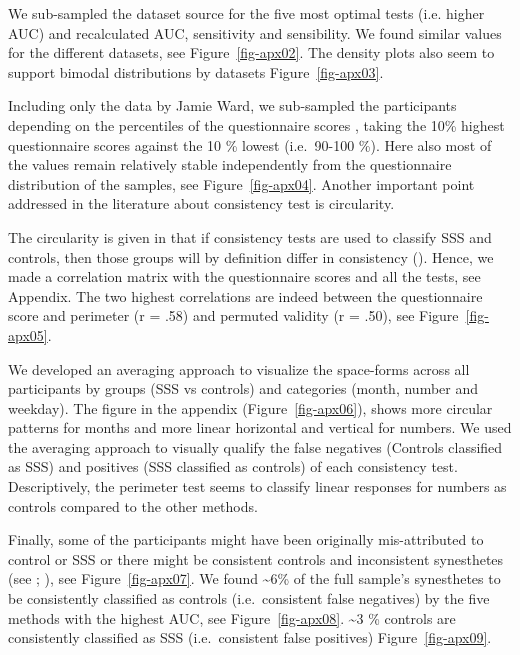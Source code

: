 \documentclass[
  man,
  floatsintext,
  longtable,
  a4paper,
  nolmodern,
  notxfonts,
  notimes,
  colorlinks=true,linkcolor=blue,citecolor=blue,urlcolor=blue]{apa7}
\begin{document}
We sub-sampled the dataset source for the five most optimal tests (i.e.
higher AUC) and recalculated AUC, sensitivity and sensibility. We found
similar values for the different datasets, see Figure~\ref{fig-apx02}.
The density plots also seem to support bimodal distributions by datasets
Figure~\ref{fig-apx03}.

Including only the data by Jamie Ward, we sub-sampled the participants
depending on the percentiles of the questionnaire scores , taking the
10\% highest questionnaire scores against the 10 \% lowest (i.e.~90-100
\%). Here also most of the values remain relatively stable independently
from the questionnaire distribution of the samples, see
Figure~\ref{fig-apx04}. Another important point addressed in the
literature about consistency test is circularity.

The circularity is given in that if consistency tests are used to
classify SSS and controls, then those groups will by definition differ
in consistency (). Hence, we
made a correlation matrix with the questionnaire scores and all the
tests, see Appendix. The two highest correlations are indeed between the
questionnaire score and perimeter (r = .58) and permuted validity (r =
.50), see Figure~\ref{fig-apx05}.

We developed an
averaging approach to visualize the space-forms across all participants
by groups (SSS vs controls) and categories (month, number and weekday).
The figure in the appendix (Figure~\ref{fig-apx06}), shows more circular
patterns for months and more linear horizontal and vertical for numbers.
We used the averaging approach to visually qualify the false negatives
(Controls classified as SSS) and positives (SSS classified as controls)
of each consistency test. Descriptively, the perimeter test seems to
classify linear responses for numbers as controls compared to the other
methods.

Finally, some of the participants might have been originally
mis-attributed to control or SSS or there might be consistent controls
and inconsistent synesthetes (see ; ), see
Figure~\ref{fig-apx07}. We found \textasciitilde6\% of the full sample's
synesthetes to be consistently classified as controls (i.e.~consistent
false negatives) by the five methods with the highest AUC, see
Figure~\ref{fig-apx08}. \textasciitilde3 \% controls are consistently
classified as SSS (i.e.~consistent false positives)
Figure~\ref{fig-apx09}.
\end{document}
